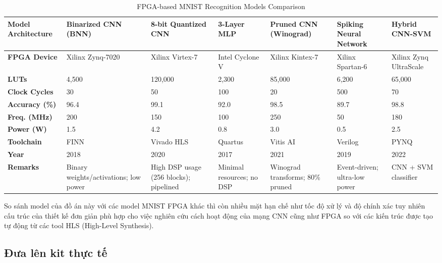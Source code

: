 \begin{center}
\begin{table}[H]
\centering
\caption{FPGA-based MNIST Recognition Models Comparison}
\label{tab:mnist_fpga_rotated}
\begin{tabular}{|p{2cm}|p{2cm}|p{2cm}|p{2cm}|p{2cm}|p{2cm}|p{2cm}|}
\hline
\textbf{Model Architecture} & \textbf{Binarized CNN (BNN)} & \textbf{8-bit Quantized CNN} & \textbf{3-Layer MLP} & \textbf{Pruned CNN (Winograd)} & \textbf{Spiking Neural Network} & \textbf{Hybrid CNN-SVM} \\ \hline
\textbf{FPGA Device} & Xilinx Zynq-7020 & Xilinx Virtex-7 & Intel Cyclone V & Xilinx Kintex-7 & Xilinx Spartan-6 & Xilinx Zynq UltraScale \\ \hline
\textbf{LUTs} & 4,500 & 120,000 & 2,300 & 85,000 & 6,200 & 65,000 \\ \hline
\textbf{Clock Cycles} & 30 & 50 & 100 & 20 & 500 & 70 \\ \hline
\textbf{Accuracy (\%)} & 96.4 & 99.1 & 92.0 & 98.5 & 89.7 & 98.8 \\ \hline
\textbf{Freq. (MHz)} & 200 & 150 & 100 & 250 & 50 & 180 \\ \hline
\textbf{Power (W)} & 1.5 & 4.2 & 0.8 & 3.0 & 0.5 & 2.5 \\ \hline
\textbf{Toolchain} & FINN & Vivado HLS & Quartus & Vitis AI & Verilog & PYNQ \\ \hline
\textbf{Year} & 2018 & 2020 & 2017 & 2021 & 2019 & 2022 \\ \hline
\textbf{Remarks} & Binary weights/activations; low power & High DSP usage (256 blocks); pipelined & Minimal resources; no DSP & Winograd transforms; 80\% pruned & Event-driven; ultra-low power & CNN + SVM classifier \\ \hline
\end{tabular}
\end{table}
\end{center}

So sánh model của đồ án này với các model MNIST FPGA khác thì còn nhiều mặt hạn chế như tốc độ xử lý và độ chính xác tuy nhiên cấu trúc của thiết kế đơn giản phù hợp cho việc nghiên cứu cách hoạt động của mạng CNN cũng như FPGA so với các kiến trúc được tạo tự động từ các tool HLS (High-Level Synthesis).

\subsection{Đưa lên kit thực tế}

